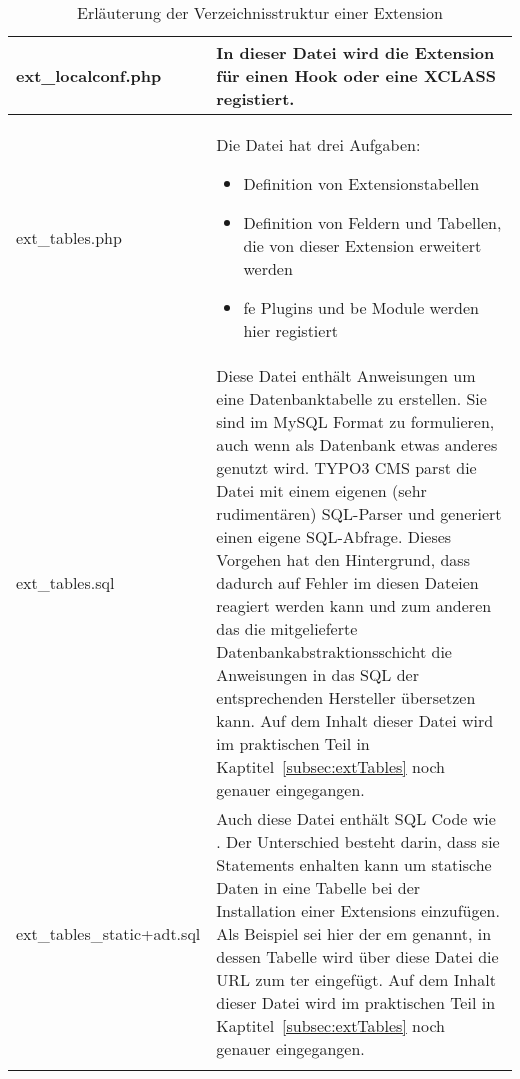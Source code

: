 \begin{longtable}{|l|p{}|}
	ext\_localconf.php & In dieser Datei wird die Extension für einen Hook oder eine XCLASS registiert.\\ \hline
	ext\_tables.php & Die Datei hat drei Aufgaben:
	\begin{itemize}
	\item Definition von Extensionstabellen
	\item Definition von Feldern und Tabellen, die von dieser Extension erweitert werden
	\item \gls{fe} Plugins und \gls{be} Module werden hier registiert
	\end{itemize}
	\\ \hline
	ext\_tables.sql & Diese Datei enthält Anweisungen um eine Datenbanktabelle zu erstellen. Sie sind im MySQL Format zu formulieren, auch wenn als Datenbank etwas anderes genutzt wird. TYPO3 CMS parst die Datei mit einem eigenen (sehr rudimentären) SQL-Parser und generiert einen eigene SQL-Abfrage. Dieses Vorgehen hat den Hintergrund, dass dadurch auf Fehler im diesen Dateien reagiert werden kann und zum anderen das die mitgelieferte Datenbankabstraktionsschicht die Anweisungen in das SQL der entsprechenden Hersteller übersetzen kann. Auf dem Inhalt dieser Datei wird im praktischen Teil in Kaptitel~\ref{subsec:extTables} noch genauer eingegangen.\\ \hline
	ext\_tables\_static+adt.sql & Auch diese Datei enthält SQL Code wie \pdf{ext\_tables.sql}. Der Unterschied besteht darin, dass sie \pdf{INSERT} Statements enhalten kann um statische Daten in eine Tabelle bei der Installation einer Extensions einzufügen. Als Beispiel sei hier der \gls{em} genannt, in dessen Tabelle wird über diese Datei die URL zum \gls{ter} eingefügt. Auf dem Inhalt dieser Datei wird im praktischen Teil in Kaptitel~\ref{subsec:extTables} noch genauer eingegangen.\\ \hline
	\caption{Erläuterung der Verzeichnisstruktur einer Extension}
	\label{tab:extensionFolderStructure}
\end{longtable}
